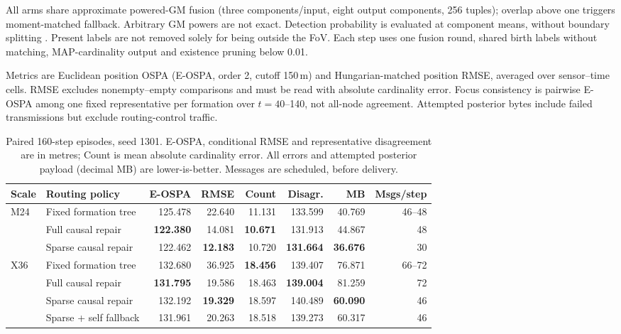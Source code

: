 \documentclass{article}
\begin{document}
All arms share approximate powered-GM fusion (three components/input, eight
output components, 256 tuples); overlap above one triggers moment-matched
fallback. Arbitrary GM powers are not exact. Detection probability is
evaluated at component means, without boundary splitting
\cite{legrand2022split}. Present labels are not removed solely for being
outside the FoV. Each step uses one fusion round, shared birth labels without
matching, MAP-cardinality output and existence pruning below 0.01.

Metrics are Euclidean position OSPA (E-OSPA, order 2, cutoff 150\,m)
\cite{schuhmacher2008ospa} and Hungarian-matched position RMSE, averaged over
sensor--time cells. RMSE excludes nonempty--empty comparisons and must be
read with absolute cardinality error. Focus consistency is pairwise E-OSPA
among one fixed representative per formation over $t=40$--140, not all-node
agreement. Attempted posterior bytes include failed transmissions but
exclude routing-control traffic.

\begin{table}[t]
\centering
\caption{Paired 160-step episodes, seed 1301. E-OSPA, conditional RMSE and
representative disagreement are in metres; Count is mean absolute cardinality
error. All errors and attempted posterior payload (decimal MB) are
lower-is-better. Messages are scheduled, before delivery.}
\label{tab:main}
\small
\begin{tabular}{llrrrrrr}
\toprule
Scale & Routing policy & E-OSPA & RMSE & Count & Disagr. & MB & Msgs/step\\
\midrule
M24 & Fixed formation tree &125.478&22.640&11.131&133.599&40.769&46--48\\
    & Full causal repair &\textbf{122.380}&14.081&\textbf{10.671}&131.913&44.867&48\\
    & Sparse causal repair &122.462&\textbf{12.183}&10.720&\textbf{131.664}&\textbf{36.676}&30\\
\midrule
X36 & Fixed formation tree &132.680&36.925&\textbf{18.456}&139.407&76.871&66--72\\
    & Full causal repair &\textbf{131.795}&19.586&18.463&\textbf{139.004}&81.259&72\\
    & Sparse causal repair &132.192&\textbf{19.329}&18.597&140.489&\textbf{60.090}&46\\
    & Sparse + self fallback &131.961&20.263&18.518&139.273&60.317&46\\
\bottomrule
\end{tabular}
\end{table}
\end{document}

